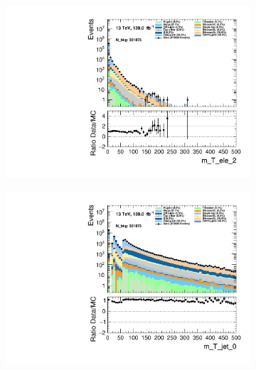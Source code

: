 \begin{figure}
\begin{subfigure}{.49\textwidth}
        \includegraphics[width=\textwidth]{Figures/MC_Data_comp/m_T_ele_2.pdf}
        \caption{ }
        \label{fig:fep}
    \end{subfigure}
    \hfill
    \begin{subfigure}{.49\textwidth}
        \includegraphics[width=\textwidth]{Figures/MC_Data_comp/m_T_jet_0.pdf}
        \caption{ }
        \label{fig:fe}
    \end{subfigure}
    \hfill       
    \caption{}
    \label{fig:t}
\end{figure}


